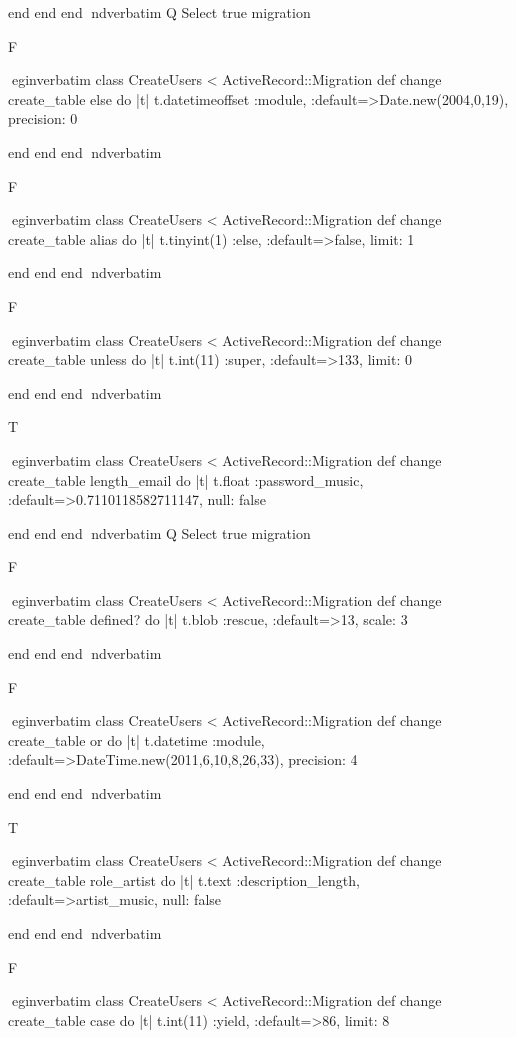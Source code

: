     end 
  end 
end
nd{verbatim}
Q
 Select true migration

F

egin{verbatim}
 class CreateUsers < ActiveRecord::Migration 
  def change 
    create_table else do |t| 
      t.datetimeoffset :module, :default=>Date.new(2004,0,19), precision: 0
    
    end 
  end 
end
nd{verbatim}

F

egin{verbatim}
 class CreateUsers < ActiveRecord::Migration 
  def change 
    create_table alias do |t| 
      t.tinyint(1) :else, :default=>false, limit: 1
    
    end 
  end 
end
nd{verbatim}

F

egin{verbatim}
 class CreateUsers < ActiveRecord::Migration 
  def change 
    create_table unless do |t| 
      t.int(11) :super, :default=>133, limit: 0
    
    end 
  end 
end
nd{verbatim}

T

egin{verbatim}
 class CreateUsers < ActiveRecord::Migration 
  def change 
    create_table length_email do |t| 
      t.float :password_music, :default=>0.7110118582711147, null: false
    
    end 
  end 
end
nd{verbatim}
Q
 Select true migration

F

egin{verbatim}
 class CreateUsers < ActiveRecord::Migration 
  def change 
    create_table defined? do |t| 
      t.blob :rescue, :default=>13, scale: 3
    
    end 
  end 
end
nd{verbatim}

F

egin{verbatim}
 class CreateUsers < ActiveRecord::Migration 
  def change 
    create_table or do |t| 
      t.datetime :module, :default=>DateTime.new(2011,6,10,8,26,33), precision: 4
    
    end 
  end 
end
nd{verbatim}

T

egin{verbatim}
 class CreateUsers < ActiveRecord::Migration 
  def change 
    create_table role_artist do |t| 
      t.text :description_length, :default=>artist_music, null: false
    
    end 
  end 
end
nd{verbatim}

F

egin{verbatim}
 class CreateUsers < ActiveRecord::Migration 
  def change 
    create_table case do |t| 
      t.int(11) :yield, :default=>86, limit: 8
    
